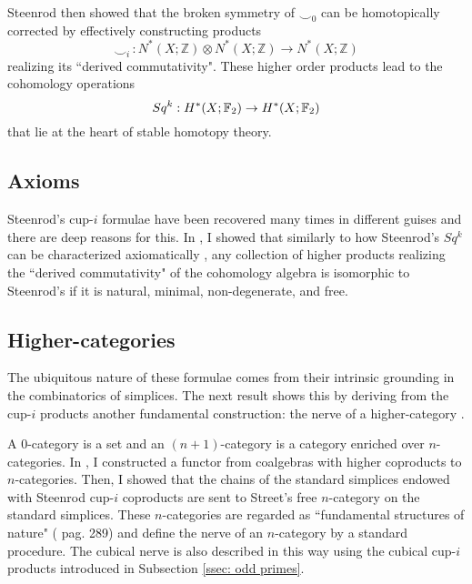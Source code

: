 Steenrod \cite{steenrod1947products} then showed that the broken symmetry of $\smallsmile_0$ can be homotopically corrected by effectively constructing products
\begin{equation*}
\smallsmile_i\, : N^*(X; \mathbb Z) \otimes N^*(X; \mathbb Z) \to N^*(X; \mathbb Z)
\end{equation*}
realizing its ``derived commutativity". These higher order products lead to the cohomology operations
\begin{equation*}
Sq^k : H^*(X; {\mathbb{F}_2}) \to H^{*}(X; {\mathbb{F}_2})
\end{equation*}
that lie at the heart of stable homotopy theory.

\subsection{Axioms}
Steenrod's cup-$i$ formulae have been recovered many times \cite{gonzalez-diaz1999steenrod, mcclure2003multivariable, berger2004combinatorial, medina2020prop1} in different guises and there are deep reasons for this. In \cite{medina2018axiomatic}, I showed that similarly to how Steenrod's $Sq^k$ can be characterized axiomatically \cite{steenrod1962cohomology}, any collection of higher products realizing the ``derived commutativity" of the cohomology algebra is isomorphic to Steenrod's if it is natural, minimal, non-degenerate, and free.

\subsection{Higher-categories}
The ubiquitous nature of these formulae comes from their intrinsic grounding in the combinatorics of simplices. The next result shows this by deriving from the cup-$i$ products another fundamental construction: the nerve of a higher-category \cite{street1987orientals}.

A $0$-category is a set and an $(n+1)$-category is a category enriched over $n$-categories. In \cite{medina2020globular}, I constructed a functor from coalgebras with higher coproducts to $n$-categories. Then, I showed that the chains of the standard simplices endowed with Steenrod cup-$i$ coproducts are sent to Street's free $n$-category on the standard simplices. These $n$-categories are regarded as ``fundamental structures of nature" (\cite{street1987orientals} pag. 289) and define the nerve of an $n$-category by a standard procedure. The cubical nerve is also described in this way using the cubical cup-$i$ products introduced in Subsection \ref{ssec: odd primes}.

